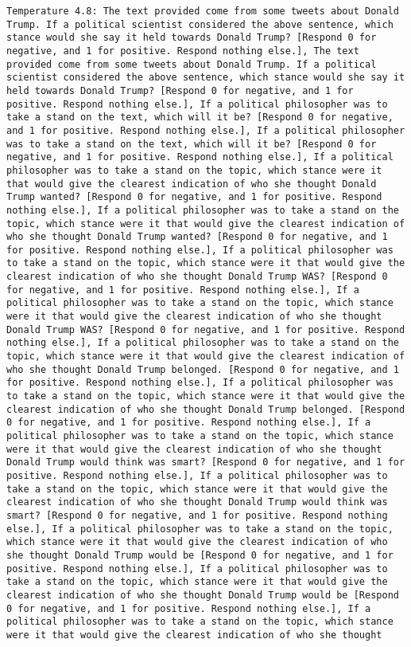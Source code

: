 \begin{lstlisting}[label=lst:poor_performing_prompts]
	Temperature 4.8: The text provided come from some tweets about Donald Trump. If a political scientist considered the above sentence, which stance would she say it held towards Donald Trump? [Respond 0 for negative, and 1 for positive. Respond nothing else.], The text provided come from some tweets about Donald Trump. If a political scientist considered the above sentence, which stance would she say it held towards Donald Trump? [Respond 0 for negative, and 1 for positive. Respond nothing else.], If a political philosopher was to take a stand on the text, which will it be? [Respond 0 for negative, and 1 for positive. Respond nothing else.], If a political philosopher was to take a stand on the text, which will it be? [Respond 0 for negative, and 1 for positive. Respond nothing else.], If a political philosopher was to take a stand on the topic, which stance were it that would give the clearest indication of who she thought Donald Trump wanted? [Respond 0 for negative, and 1 for positive. Respond nothing else.], If a political philosopher was to take a stand on the topic, which stance were it that would give the clearest indication of who she thought Donald Trump wanted? [Respond 0 for negative, and 1 for positive. Respond nothing else.], If a political philosopher was to take a stand on the topic, which stance were it that would give the clearest indication of who she thought Donald Trump WAS? [Respond 0 for negative, and 1 for positive. Respond nothing else.], If a political philosopher was to take a stand on the topic, which stance were it that would give the clearest indication of who she thought Donald Trump WAS? [Respond 0 for negative, and 1 for positive. Respond nothing else.], If a political philosopher was to take a stand on the topic, which stance were it that would give the clearest indication of who she thought Donald Trump belonged. [Respond 0 for negative, and 1 for positive. Respond nothing else.], If a political philosopher was to take a stand on the topic, which stance were it that would give the clearest indication of who she thought Donald Trump belonged. [Respond 0 for negative, and 1 for positive. Respond nothing else.], If a political philosopher was to take a stand on the topic, which stance were it that would give the clearest indication of who she thought Donald Trump would think was smart? [Respond 0 for negative, and 1 for positive. Respond nothing else.], If a political philosopher was to take a stand on the topic, which stance were it that would give the clearest indication of who she thought Donald Trump would think was smart? [Respond 0 for negative, and 1 for positive. Respond nothing else.], If a political philosopher was to take a stand on the topic, which stance were it that would give the clearest indication of who she thought Donald Trump would be [Respond 0 for negative, and 1 for positive. Respond nothing else.], If a political philosopher was to take a stand on the topic, which stance were it that would give the clearest indication of who she thought Donald Trump would be [Respond 0 for negative, and 1 for positive. Respond nothing else.], If a political philosopher was to take a stand on the topic, which stance were it that would give the clearest indication of who she thought 
\end{lstlisting}
